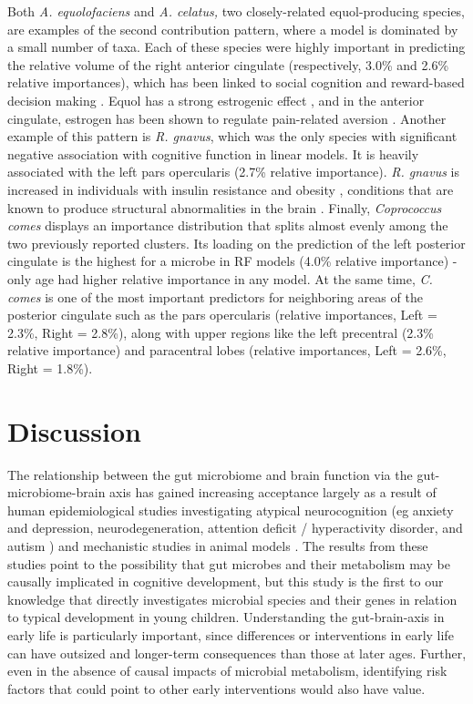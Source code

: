 \documentclass{article}
\begin{document}
Both \emph{A. equolofaciens} and \emph{A. celatus,} two closely-related
equol-producing species, are examples of the second contribution
pattern, where a model is dominated by a small number of taxa.
Each of these species were highly important in predicting the relative volume of
the right anterior cingulate (respectively, 3.0\% and 2.6\% relative
importances), which has been linked to social cognition and reward-based
decision making
\cite{appsAnteriorCingulateGyrus2016,boesRightAnteriorCingulate2008,bushDorsalAnteriorCingulate2002}.
Equol has a strong estrogenic effect
\cite{setchellSEquolPotentLigand2005},
and in the anterior cingulate, estrogen has been shown to regulate
pain-related aversion
\cite{xiaoEstrogenAnteriorCingulate2013}.
Another example of this pattern is \emph{R. gnavus}, which was the only
species with significant negative association with cognitive function in linear models.
It is heavily associated with the left pars opercularis (2.7\% relative
importance). \textit{R. gnavus} is increased in individuals with insulin
resistance and obesity \cite{leyHumanGutMicrobes2006},
conditions that are known to produce structural abnormalities in the brain
\cite{opelBrainStructuralAbnormalities2021}.
Finally, \emph{Coprococcus comes} displays an importance
distribution that splits almost evenly among the two previously reported
clusters. Its loading on the prediction of the left posterior cingulate
is the highest for a microbe in RF models (4.0\% relative importance) -
only age had higher relative importance in any model. At the same time,
\textit{C. comes} is one of the most important predictors for neighboring areas of the
posterior cingulate such as the pars opercularis (relative importances,
Left = 2.3\%, Right = 2.8\%), along with upper regions like the left
precentral (2.3\% relative importance) and paracentral lobes (relative
importances, Left = 2.6\%, Right = 1.8\%).

\section*{Discussion}

The relationship between the gut microbiome and brain function via the
gut-microbiome-brain axis has gained increasing acceptance largely as a
result of human epidemiological studies investigating atypical
neurocognition (eg anxiety and depression, neurodegeneration, attention
deficit / hyperactivity disorder, and autism \cite{romanGutBrainAxis2018,fosterGutBrainAxis2013})
and mechanistic studies in animal models
\cite{hsiaoMicrobiotaModulateBehavioral2013,needhamGutderivedMetaboliteAlters2022}.
The results from these studies point to the possibility
that gut microbes and their metabolism may be causally implicated in
cognitive development, but this study is the first to our knowledge that
directly investigates microbial species and their genes in relation to
typical development in young children. Understanding the gut-brain-axis
in early life is particularly important, since differences or
interventions in early life can have outsized and longer-term
consequences than those at later ages. Further, even in the absence of
causal impacts of microbial metabolism, identifying risk factors that
could point to other early interventions would also have value.
\end{document}
